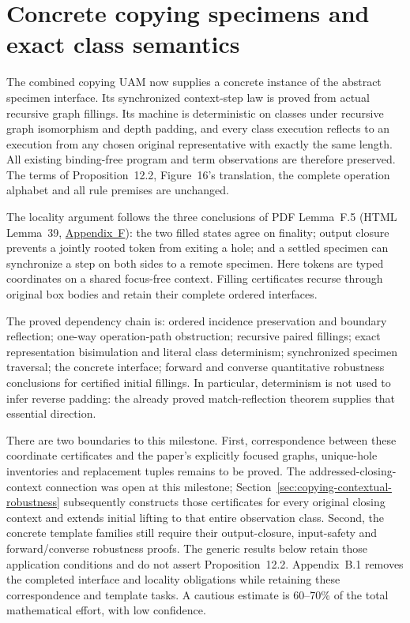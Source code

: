 \clearpage
\section{Concrete copying specimens and exact class semantics}
\label{sec:copying-specimens}
The combined copying UAM now supplies a concrete instance of the abstract
specimen interface. Its synchronized context-step law is proved from actual
recursive graph fillings. Its machine is deterministic on classes under
recursive graph isomorphism and depth padding, and every class execution
reflects to an execution from any chosen original representative with exactly
the same length. All existing binding-free program and term observations are
therefore preserved. The terms of Proposition~12.2, Figure~16's translation,
the complete operation alphabet and all rule premises are unchanged.

The locality argument follows the three conclusions of PDF Lemma~F.5
(HTML Lemma~39, \href{https://arxiv.org/html/1907.01257v5\#A6}{Appendix~F}):
the two filled states agree on finality; output closure prevents a jointly
rooted token from exiting a hole; and a settled specimen can synchronize a
step on both sides to a remote specimen. Here tokens are typed coordinates
on a shared focus-free context. Filling certificates recurse through original
box bodies and retain their complete ordered interfaces.

The proved dependency chain is: ordered incidence preservation and boundary
reflection; one-way operation-path obstruction; recursive paired fillings;
exact representation bisimulation and literal class determinism; synchronized
specimen traversal; the concrete interface; forward and converse quantitative
robustness conclusions for certified initial fillings. In particular,
determinism is not used to infer reverse padding: the already proved
match-reflection theorem supplies that essential direction.

There are two boundaries to this milestone. First, correspondence between
these coordinate certificates and the paper's explicitly focused graphs,
unique-hole inventories and replacement tuples remains to be proved.
The addressed-closing-context connection was open at this milestone;
Section~\ref{sec:copying-contextual-robustness} subsequently constructs those
certificates for every original closing context and extends initial lifting
to that entire observation class.
Second, the concrete template families still require their output-closure,
input-safety and forward/converse robustness proofs. The generic results below
retain those application conditions and do not assert Proposition~12.2.
Appendix~B.1 removes the completed interface and locality obligations while
retaining these correspondence and template tasks. A cautious estimate is
60--70\% of the total mathematical effort, with low confidence.

